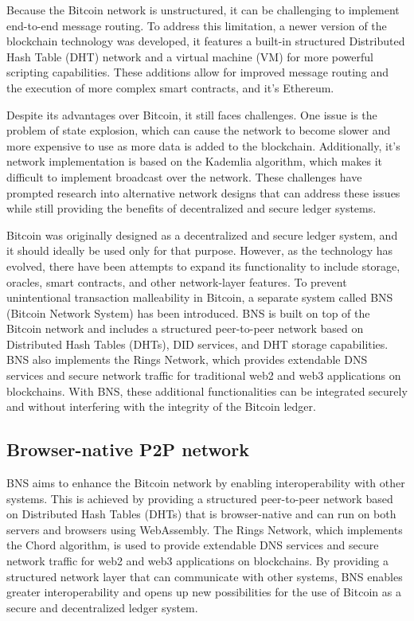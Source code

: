 \documentclass[twocolumn]{article}
\begin{document}
Because the Bitcoin network is unstructured, it can be challenging to implement end-to-end message routing\cite{bano2017consensus}. To address this limitation, a newer version of the blockchain technology was developed, it features a built-in structured Distributed Hash Table (DHT) network and a virtual machine (VM) for more powerful scripting capabilities\cite{wood2014ethereum}. These additions allow for improved message routing and the execution of more complex smart contracts\cite{buterin2014ethereum}, and it's Ethereum.

Despite its advantages over Bitcoin, it still faces challenges. One issue is the problem of state explosion, which can cause the network to become slower and more expensive to use as more data is added to the blockchain\cite{wood2014ethereum}. Additionally, it's network implementation is based on the Kademlia algorithm, which makes it difficult to implement broadcast over the network\cite{gervais2016security}. These challenges have prompted research into alternative network designs that can address these issues while still providing the benefits of decentralized and secure ledger systems.

Bitcoin was originally designed as a decentralized and secure ledger system, and it should ideally be used only for that purpose. However, as the technology has evolved, there have been attempts to expand its functionality to include storage, oracles, smart contracts, and other network-layer features. To prevent unintentional transaction malleability in Bitcoin, a separate system called BNS (Bitcoin Network System) has been introduced. BNS is built on top of the Bitcoin network and includes a structured peer-to-peer network based on Distributed Hash Tables (DHTs), DID services, and DHT storage capabilities. BNS also implements the Rings Network, which provides extendable DNS services and secure network traffic for traditional web2 and web3 applications on blockchains. With BNS, these additional functionalities can be integrated securely and without interfering with the integrity of the Bitcoin ledger.

\subsection{Browser-native P2P network}

BNS aims to enhance the Bitcoin network by enabling interoperability with other systems. This is achieved by providing a structured peer-to-peer network based on Distributed Hash Tables (DHTs) that is browser-native and can run on both servers and browsers using WebAssembly. The Rings Network, which implements the Chord algorithm, is used to provide extendable DNS services and secure network traffic for web2 and web3 applications on blockchains. By providing a structured network layer that can communicate with other systems, BNS enables greater interoperability and opens up new possibilities for the use of Bitcoin as a secure and decentralized ledger system.
\end{document}
